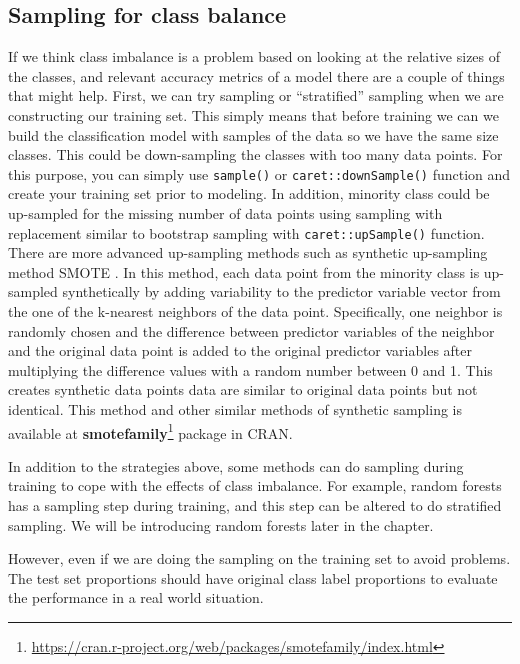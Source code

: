 \documentclass[12pt,]{krantz}
\renewcommand{\href}[2]{#2\footnote{\url{#1}}}
\begin{document}
\hypertarget{sampling-for-class-balance}{%
\subsection{Sampling for class balance}\label{sampling-for-class-balance}}

If we think class imbalance is a problem based on looking at the relative sizes of the classes, and relevant accuracy metrics of a model there are a couple of things that might help. First, we can try sampling or ``stratified'' sampling when we are constructing our training set. This simply means that before training we can we build the classification model with samples of the data so we have the same size classes. This could be down-sampling the classes with too many data points. For this purpose, you can simply use \texttt{sample()} or \texttt{caret::downSample()} function and create your training set prior to modeling. In addition, minority class could be up-sampled for the missing number of data points using sampling with replacement similar to bootstrap sampling with \texttt{caret::upSample()} function. There are more advanced up-sampling methods such as synthetic up-sampling method SMOTE \citep{smote}. In this method, each data point from the minority class is up-sampled synthetically by adding variability to the predictor variable vector from the one of the k-nearest neighbors of the data point. Specifically, one neighbor is randomly chosen and the difference between predictor variables of the neighbor and the original data point is added to the original predictor variables after multiplying the difference values with a random number between 0 and 1. This creates synthetic data points data are similar to original data points but not identical. This method and other similar methods of synthetic sampling is available at \href{https://cran.r-project.org/web/packages/smotefamily/index.html}{\textbf{smotefamily}} package in CRAN.

In addition to the strategies above, some methods can do sampling during training to cope with the effects of class imbalance. For example, random forests has a sampling step during training, and this step can be altered to do stratified sampling. We will be introducing random forests later in the chapter.

However, even if we are doing the sampling on the training set to avoid problems. The test set proportions should have original class label proportions to evaluate the performance in a real world situation.
\end{document}

